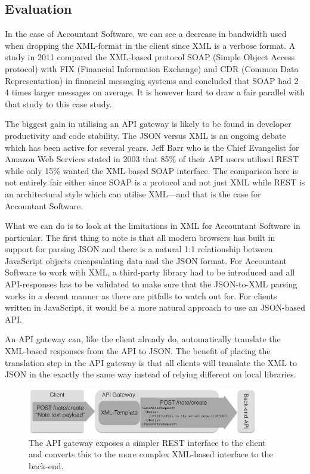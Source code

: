 \documentclass{cslthse-msc}
\begin{document}
\subsection{Evaluation}

In the case of Accountant Software, we can see a decrease in bandwidth used when dropping the XML-format in the client since XML is a verbose format. A study in 2011 compared the XML-based protocol SOAP (Simple Object Access protocol) with FIX (Financial Information Exchange) and CDR (Common Data Representation) in financial messaging systems and concluded that SOAP had 2--4 times larger messages on average\cite{soap_fix}. It is however hard to draw a fair parallel with that study to this case study.

The biggest gain in utilising an API gateway is likely to be found in developer productivity and code stability. The JSON versus XML is an ongoing debate which has been active for several years. Jeff Barr who is the Chief Evangelist for Amazon Web Services stated in 2003 that 85\% of their API users utilised REST while only 15\% wanted the XML-based SOAP interface\cite{soap_amazon}. The comparison here is not entirely fair either since SOAP is a protocol and not just XML while REST is an architectural style which can utilise XML---and that is the case for Accountant Software.

What we can do is to look at the limitations in XML for Accountant Software in particular. The first thing to note is that all modern browsers has built in support for parsing JSON and there is a natural 1:1 relationship between JavaScript objects encapsulating data and the JSON format. For Accountant Software to work with XML, a third-party library had to be introduced and all API-responses has to be validated to make sure that the JSON-to-XML parsing works in a decent manner as there are pitfalls to watch out for. For clients written in JavaScript, it would be a more natural approach to use an JSON-based API. 

An API gateway can, like the client already do, automatically translate the XML-based responses from the API to JSON. The benefit of placing the translation step in the API gateway is that all clients will translate the XML to JSON in the exactly the same way instead of relying different on local libraries.

\begin{figure}[H]
  \centering
    \begin{center}
      \includegraphics[width=0.9\textwidth]{images/api_gateway_xml.png}
    \end{center}
  \caption{The API gateway exposes a simpler REST interface to the client and converts this to the more complex XML-based interface to the back-end.}
\end{figure}
\end{document}
